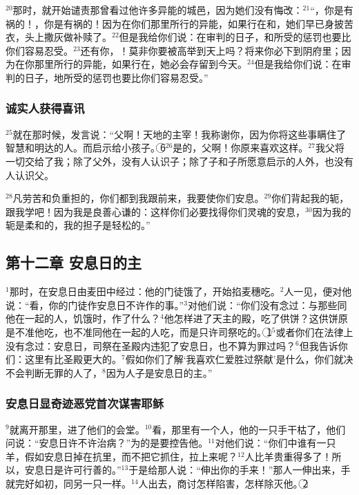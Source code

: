 $^{20}$那时，\UL[耶稣]就开始谴责那曾看过他许多异能的城邑，因为她们没有悔改：$^{21}$“\UL[苛辣匝因]，你是有祸的！\UL[贝特赛达]，你是有祸的！因为在你们那里所行的异能，如果行在\UL[提洛]和\UL[漆冬]，她们早已身披苦衣，头上撒灰做补赎了。$^{22}$但是我给你们说：在审判的日子，\UL[提洛]和\UL[漆冬]所受的惩罚也要比你们容易忍受。$^{23}$还有你，\UL[葛法翁]！莫非你要被高举到天上吗？将来你必下到阴府里；因为在你那里所行的异能，如果行在\UL[索多玛]，她必会存留到今天。$^{24}$但是我给你们说：在审判的日子，\UL[索多玛]地所受的惩罚也要比你们容易忍受。”


\subsubsection{诚实人获得喜讯}
$^{25}$就在那时候，\UL[耶稣]发言说：“父啊！天地的主宰！我称谢你，因为你将这些事瞒住了智慧和明达的人。而启示给小孩子。\textcircled{6}$^{26}$是的，父啊！你原来喜欢这样。$^{27}$我父将一切交给了我；除了父外，没有人认识子；除了子和子所愿意启示的人外，也没有人认识父。

$^{28}$凡劳苦和负重担的，你们都到我跟前来，我要使你们安息。$^{29}$你们背起我的轭，跟我学吧！因为我是良善心谦的：这样你们必要找得你们灵魂的安息，$^{30}$因为我的轭是柔和的，我的担子是轻松的。”


\subsection{第十二章 安息日的主}
$^{1}$那时，\UL[耶稣]在安息日由麦田中经过：他的门徒饿了，开始掐麦穗吃。$^{2}$\UL[法利塞]人一见，便对他说：“看，你的门徒作安息日不许作的事。”$^{3}$\UL[耶稣]对他们说：“你们没有念过：\UL[达味]与那些同他在一起的人，饥饿时，作了什么？$^{4}$他怎样进了天主的殿，吃了供饼？这供饼原是不准他吃，也不准同他在一起的人吃，而是只许司祭吃的。\textcircled{1}$^{5}$或者你们在法律上没有念过：安息日，司祭在圣殿内违犯了安息日，也不算为罪过吗？$^{6}$但我告诉你们：这里有比圣殿更大的。$^{7}$假如你们了解‘我喜欢仁爱胜过祭献’是什么，你们就决不会判断无罪的人了，$^{8}$因为人子是安息日的主。”

\subsubsection{安息日显奇迹恶党首次谋害耶稣}
$^{9}$\UL[耶稣]就离开那里，进了他们的会堂。$^{10}$看，那里有一个人，他的一只手干枯了，他们问\UL[耶稣]说：“安息日许不许治病？”为的是要控告他。$^{11}$\UL[耶稣]对他们说：“你们中谁有一只羊，假如安息日掉在抗里，而不把它抓住，拉上来呢？$^{12}$人比羊贵重得多了！所以，安息日是许可行善的。”$^{13}$于是给那人说：“伸出你的手来！”那人一伸出来，手就完好如初，同另一只一样。$^{14}$\UL[法利塞]人出去，商讨怎样陷害\UL[耶稣]，怎样除灭他。\textcircled{2}


